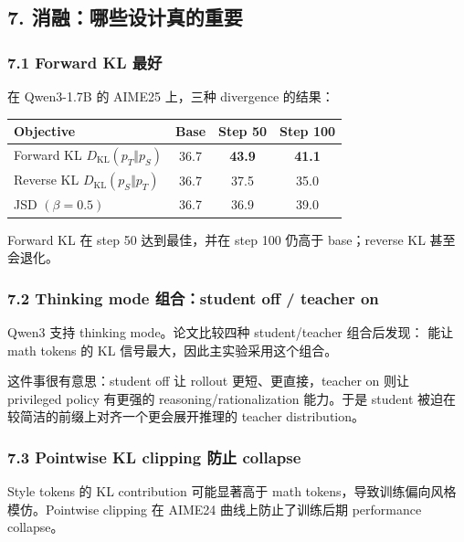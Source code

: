 \subsection{7. 消融：哪些设计真的重要}

\subsubsection{7.1 Forward KL 最好}

在 Qwen3-1.7B 的 AIME25 上，三种 divergence 的结果：

\begin{center}
\begin{tabular}{lccc}
\toprule
\textbf{Objective} & \textbf{Base} & \textbf{Step 50} & \textbf{Step 100}\\
\midrule
Forward KL $D_{\mathrm{KL}}(p_T\Vert p_S)$ & 36.7 & \textbf{43.9} & \textbf{41.1}\\
Reverse KL $D_{\mathrm{KL}}(p_S\Vert p_T)$ & 36.7 & 37.5 & 35.0\\
JSD $(\beta=0.5)$ & 36.7 & 36.9 & 39.0\\
\bottomrule
\end{tabular}
\end{center}

Forward KL 在 step 50 达到最佳，并在 step 100 仍高于 base；reverse KL 甚至会退化。

\subsubsection{7.2 Thinking mode 组合：student off / teacher on}

Qwen3 支持 thinking mode。论文比较四种 student/teacher 组合后发现： 能让 math tokens 的 KL 信号最大，因此主实验采用这个组合。

这件事很有意思：student off 让 rollout 更短、更直接，teacher on 则让 privileged policy 有更强的 reasoning/rationalization 能力。于是 student 被迫在较简洁的前缀上对齐一个更会展开推理的 teacher distribution。

\subsubsection{7.3 Pointwise KL clipping 防止 collapse}

Style tokens 的 KL contribution 可能显著高于 math tokens，导致训练偏向风格模仿。Pointwise clipping 在 AIME24 曲线上防止了训练后期 performance collapse。

